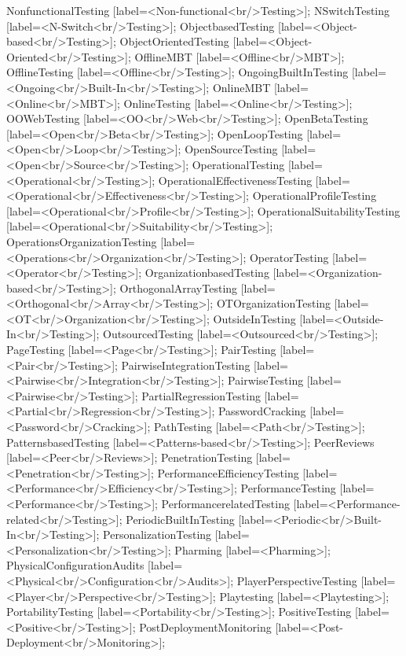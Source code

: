\documentclass{article}
\begin{document}
{NonfunctionalTesting [label=<Non-functional<br/>Testing>];
NSwitchTesting [label=<N-Switch<br/>Testing>];
ObjectbasedTesting [label=<Object-based<br/>Testing>];
ObjectOrientedTesting [label=<Object-Oriented<br/>Testing>];
OfflineMBT [label=<Offline<br/>MBT>];
OfflineTesting [label=<Offline<br/>Testing>];
OngoingBuiltInTesting [label=<Ongoing<br/>Built-In<br/>Testing>];
OnlineMBT [label=<Online<br/>MBT>];
OnlineTesting [label=<Online<br/>Testing>];
OOWebTesting [label=<OO<br/>Web<br/>Testing>];
OpenBetaTesting [label=<Open<br/>Beta<br/>Testing>];
OpenLoopTesting [label=<Open<br/>Loop<br/>Testing>];
OpenSourceTesting [label=<Open<br/>Source<br/>Testing>];
OperationalTesting [label=<Operational<br/>Testing>];
OperationalEffectivenessTesting [label=<Operational<br/>Effectiveness<br/>Testing>];
OperationalProfileTesting [label=<Operational<br/>Profile<br/>Testing>];
OperationalSuitabilityTesting [label=<Operational<br/>Suitability<br/>Testing>];
OperationsOrganizationTesting [label=<Operations<br/>Organization<br/>Testing>];
OperatorTesting [label=<Operator<br/>Testing>];
OrganizationbasedTesting [label=<Organization-based<br/>Testing>];
OrthogonalArrayTesting [label=<Orthogonal<br/>Array<br/>Testing>];
OTOrganizationTesting [label=<OT<br/>Organization<br/>Testing>];
OutsideInTesting [label=<Outside-In<br/>Testing>];
OutsourcedTesting [label=<Outsourced<br/>Testing>];
PageTesting [label=<Page<br/>Testing>];
PairTesting [label=<Pair<br/>Testing>];
PairwiseIntegrationTesting [label=<Pairwise<br/>Integration<br/>Testing>];
PairwiseTesting [label=<Pairwise<br/>Testing>];
PartialRegressionTesting [label=<Partial<br/>Regression<br/>Testing>];
PasswordCracking [label=<Password<br/>Cracking>];
PathTesting [label=<Path<br/>Testing>];
PatternsbasedTesting [label=<Patterns-based<br/>Testing>];
PeerReviews [label=<Peer<br/>Reviews>];
PenetrationTesting [label=<Penetration<br/>Testing>];
PerformanceEfficiencyTesting [label=<Performance<br/>Efficiency<br/>Testing>];
PerformanceTesting [label=<Performance<br/>Testing>];
PerformancerelatedTesting [label=<Performance-related<br/>Testing>];
PeriodicBuiltInTesting [label=<Periodic<br/>Built-In<br/>Testing>];
PersonalizationTesting [label=<Personalization<br/>Testing>];
Pharming [label=<Pharming>];
PhysicalConfigurationAudits [label=<Physical<br/>Configuration<br/>Audits>];
PlayerPerspectiveTesting [label=<Player<br/>Perspective<br/>Testing>];
Playtesting [label=<Playtesting>];
PortabilityTesting [label=<Portability<br/>Testing>];
PositiveTesting [label=<Positive<br/>Testing>];
PostDeploymentMonitoring [label=<Post-Deployment<br/>Monitoring>];
}
\end{document}
